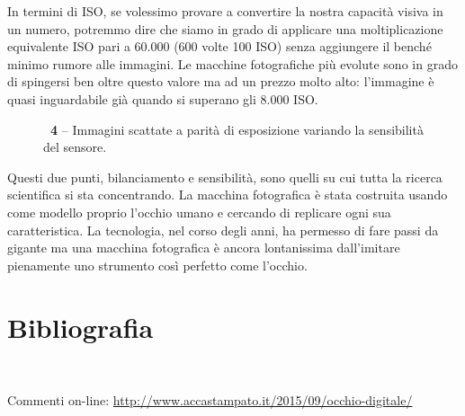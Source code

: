 In termini di ISO, se volessimo provare a convertire la nostra capacità visiva in un numero, potremmo dire che siamo in grado di applicare una moltiplicazione equivalente ISO pari a 60.000 (600 volte 100 ISO) senza aggiungere il benché minimo rumore alle immagini. Le macchine fotografiche più evolute sono in grado di spingersi ben oltre questo valore ma ad un prezzo molto alto: l'immagine è quasi inguardabile già quando si superano gli 8.000 ISO.

\begin{figure}[!t]
\begin{center}
\caption{\textbf{\figurename~4} -- Immagini scattate a parità di esposizione variando la sensibilità del sensore.}
\label{fig:iso}
\end{center}
\vskip-20pt
\end{figure}

Questi due punti, bilanciamento e sensibilità, sono quelli su cui tutta la ricerca scientifica si sta concentrando. La macchina fotografica è stata costruita usando come modello proprio l'occhio umano e cercando di replicare ogni sua caratteristica. La tecnologia, nel corso degli anni, ha permesso di fare passi da gigante ma una macchina fotografica è ancora lontanissima dall'imitare pienamente uno strumento così perfetto come l'occhio. 

\balance
\section*{Bibliografia}
\\

\smallskip
Commenti on-line: \url{http://www.accastampato.it/2015/09/occhio-digitale/}

